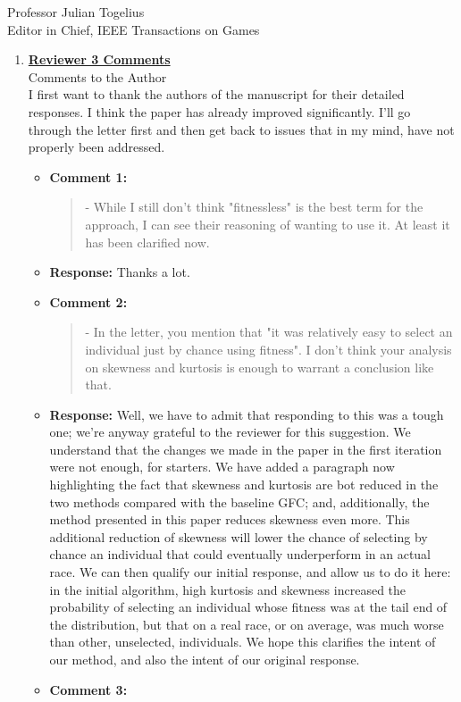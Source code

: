 \documentclass[10pt]{letter} %
\begin{document}
\begin{letter}{Professor Julian Togelius \\ Editor in Chief, IEEE Transactions on Games}
\begin{enumerate}
%
\item {\bf \underline{ Reviewer 3 Comments}}\\
		Comments to the Author\\
		I first want to thank the authors of the manuscript for their detailed responses. I think the paper has already improved significantly. I'll go through the letter first and then get back to issues that in my mind, have not properly been addressed.	
		\begin{itemize}
			\item {\bf Comment 1:}
				\begin{quote}	
					- While I still don't think "fitnessless" is the best term for the approach, I can see their reasoning of wanting to use it. At least it has been clarified now.
				\end{quote}	
			\item {\bf Response:} 
                          Thanks a lot.
			\item {\bf Comment 2:}
				\begin{quote}	
					- In the letter, you mention that "it was relatively easy to select an individual just by chance using fitness". I don't think your analysis on skewness and kurtosis is enough to warrant a conclusion like that.
				\end{quote}	
			\item {\bf Response:} 
Well, we have to admit that responding to this was a tough one; we're
anyway grateful to the reviewer for this suggestion. We understand
that the changes we made in the paper in the first iteration were not
enough, for starters. We have added a paragraph now highlighting the
fact that skewness and kurtosis are bot reduced in the two methods
compared with the baseline  {\sf GFC}; and, additionally, the method
presented in this paper reduces skewness even more. This additional
reduction of skewness will lower the chance of selecting by chance an
individual that could eventually underperform in an actual race. We
can then qualify our initial response, and allow us to do it here: in
the initial algorithm, high kurtosis and skewness increased the
probability of selecting an individual whose fitness was at the tail
end of the distribution, but that on a real race, or on average, was
much worse than other, unselected, individuals. We hope this clarifies
the intent of our method, and also the intent of our original response.
			\item {\bf Comment 3:}

\end{itemize}
\end{enumerate}
\end{letter}
\end{document}

